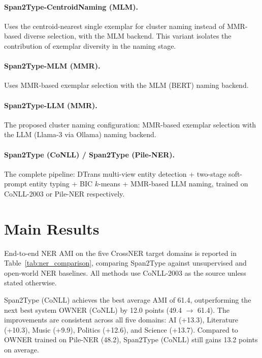 \documentclass[14pt]{extreport}
\begin{document}
\paragraph{Span2Type-CentroidNaming (MLM).}
Uses the centroid-nearest single exemplar for cluster naming instead of MMR-based diverse selection, with the MLM backend. This variant isolates the contribution of exemplar diversity in the naming stage.

\paragraph{Span2Type-MLM (MMR).}
Uses MMR-based exemplar selection with the MLM (BERT) naming backend.

\paragraph{Span2Type-LLM (MMR).}
The proposed cluster naming configuration: MMR-based exemplar selection with the LLM (Llama-3 via Ollama) naming backend.

\paragraph{Span2Type (CoNLL) / Span2Type (Pile-NER).}
The complete pipeline: DTrans multi-view entity detection + two-stage soft-prompt entity typing + BIC $k$-means + MMR-based LLM naming, trained on CoNLL-2003 or Pile-NER respectively.


\section{Main Results}

End-to-end NER AMI on the five CrossNER target domains is reported in Table~\ref{tab:ner_comparison}, comparing Span2Type against unsupervised and open-world NER baselines. All methods use CoNLL-2003 as the source unless stated otherwise.

\FloatBarrier



\FloatBarrier

Span2Type (CoNLL) achieves the best average AMI of 61.4, outperforming the next best system OWNER (CoNLL) by 12.0 points (49.4 $\to$ 61.4). The improvements are consistent across all five domains: AI (+13.3), Literature (+10.3), Music (+9.9), Politics (+12.6), and Science (+13.7). Compared to OWNER trained on Pile-NER (48.2), Span2Type (CoNLL) still gains 13.2 points on average.
\end{document}
